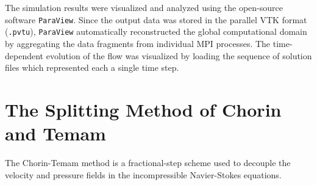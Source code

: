 \documentclass[11pt,a4paper]{article}
\begin{document}
The simulation results were visualized and analyzed using the open-source software \texttt{ParaView}. Since the output data was stored in the parallel VTK format (\texttt{.pvtu}), \texttt{ParaView} automatically reconstructed the global computational domain by aggregating the data fragments from individual MPI processes. The time-dependent evolution of the flow was visualized by loading the sequence of solution files which represented each a single time step.

\section{The Splitting Method of Chorin and Temam}
\label{sec:ChorinTemam}
The Chorin-Temam method is a fractional-step scheme used to decouple the velocity and pressure fields in the incompressible Navier-Stokes equations.
\end{document}
